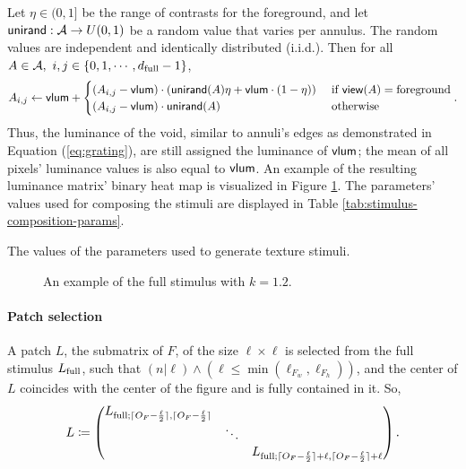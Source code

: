 Let $\eta \in (0, 1]$ be the range of contrasts for the foreground, and let $\mathsf{unirand}: \mathcal{A} \to U(0, 1)$ be a random value that varies per annulus. The random values are independent and identically distributed (i.i.d.). Then for all $A \in \mathcal{A}, \ i, j \in \{ 0, 1, \cdots, d_{\mathrm{full}} - 1 \}$,
\begin{equation}
    A_{i, j} \leftarrow \mathsf{vlum} +
    \begin{cases}
        (A_{i, j} - \mathsf{vlum}) \cdot \left( \mathsf{unirand}(A) \eta + \mathsf{vlum} \cdot (1 - \eta) \right) &\text{ if } \mathsf{view}(A) = \mathrm{foreground}  \\
        (A_{i, j} - \mathsf{vlum}) \cdot \mathsf{unirand}(A) &\text{ otherwise}
    \end{cases}.
\end{equation}
Thus, the luminance of the void, similar to annuli's edges as demonstrated in Equation (\ref{eq:grating}), are still assigned the luminance of $\mathsf{vlum}$; the mean of all pixels' luminance values is also equal to $\mathsf{vlum}$. An example of the resulting luminance matrix' binary heat map is visualized in Figure \ref{fig:full-stimulus-example}. The parameters' values used for composing the stimuli are displayed in Table \ref{tab:stimulus-composition-params}.

\begin{table}[!htp]
    \centering
    
    \caption{The values of the parameters used to generate texture stimuli.}
    \label{tab:stimulus-composition-params}
\end{table}

\begin{figure}[!htp]
    \centering
    
    \caption{An example of the full stimulus with $k = 1.2$. }
    \label{fig:full-stimulus-example}
\end{figure}


\paragraph{Patch selection}

A patch $L$, the submatrix of $F$, of the size $\ell \times \ell$ is selected from the full stimulus $L_{\mathrm{full}}$, such that $(n | \ell) \land (\ell \leq \min(\ell_{F_w}, \ell_{F_h}))$, and the center of $L$ coincides with the center of the figure and is fully contained in it. So,
\begin{equation}
    L \coloneqq 
    \begin{pmatrix}
        L_{\mathrm{full}; \lceil O_F - \frac{\ell}{2}\rceil, \lceil  O_F - \frac{\ell}{2} \rceil} &  &  \\
         & \ddots &  \\
         &  &  L_{\mathrm{full}; \lceil O_F - \frac{\ell}{2}\rceil + \ell, \lceil  O_F - \frac{\ell}{2}\rceil + \ell}
    \end{pmatrix}.
\end{equation}

